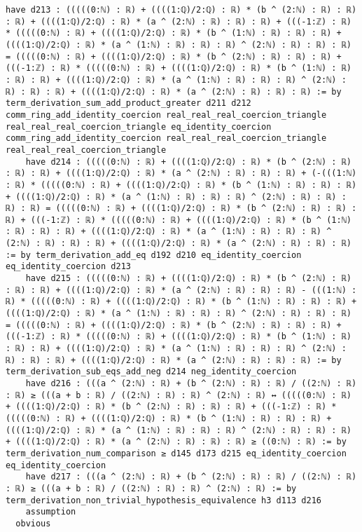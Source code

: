 \documentclass{article}
\begin{document}
\begin{tcolorbox}[colback=white!10, width=\linewidth]
\begin{lstlisting}[language=Lean4]
    have d213 : (((((0:ℕ) : ℝ) + ((((1:ℚ)/2:ℚ) : ℝ) * (b ^ (2:ℕ) : ℝ) : ℝ) : ℝ) + ((((1:ℚ)/2:ℚ) : ℝ) * (a ^ (2:ℕ) : ℝ) : ℝ) : ℝ) + (((-1:ℤ) : ℝ) * (((((0:ℕ) : ℝ) + ((((1:ℚ)/2:ℚ) : ℝ) * (b ^ (1:ℕ) : ℝ) : ℝ) : ℝ) + ((((1:ℚ)/2:ℚ) : ℝ) * (a ^ (1:ℕ) : ℝ) : ℝ) : ℝ) ^ (2:ℕ) : ℝ) : ℝ) : ℝ) = (((((0:ℕ) : ℝ) + ((((1:ℚ)/2:ℚ) : ℝ) * (b ^ (2:ℕ) : ℝ) : ℝ) : ℝ) + (((-1:ℤ) : ℝ) * (((((0:ℕ) : ℝ) + ((((1:ℚ)/2:ℚ) : ℝ) * (b ^ (1:ℕ) : ℝ) : ℝ) : ℝ) + ((((1:ℚ)/2:ℚ) : ℝ) * (a ^ (1:ℕ) : ℝ) : ℝ) : ℝ) ^ (2:ℕ) : ℝ) : ℝ) : ℝ) + ((((1:ℚ)/2:ℚ) : ℝ) * (a ^ (2:ℕ) : ℝ) : ℝ) : ℝ) := by term_derivation_sum_add_product_greater d211 d212 comm_ring_add_identity_coercion real_real_real_coercion_triangle real_real_real_coercion_triangle eq_identity_coercion comm_ring_add_identity_coercion real_real_real_coercion_triangle real_real_real_coercion_triangle
    have d214 : (((((0:ℕ) : ℝ) + ((((1:ℚ)/2:ℚ) : ℝ) * (b ^ (2:ℕ) : ℝ) : ℝ) : ℝ) + ((((1:ℚ)/2:ℚ) : ℝ) * (a ^ (2:ℕ) : ℝ) : ℝ) : ℝ) + (-(((1:ℕ) : ℝ) * (((((0:ℕ) : ℝ) + ((((1:ℚ)/2:ℚ) : ℝ) * (b ^ (1:ℕ) : ℝ) : ℝ) : ℝ) + ((((1:ℚ)/2:ℚ) : ℝ) * (a ^ (1:ℕ) : ℝ) : ℝ) : ℝ) ^ (2:ℕ) : ℝ) : ℝ) : ℝ) : ℝ) = (((((0:ℕ) : ℝ) + ((((1:ℚ)/2:ℚ) : ℝ) * (b ^ (2:ℕ) : ℝ) : ℝ) : ℝ) + (((-1:ℤ) : ℝ) * (((((0:ℕ) : ℝ) + ((((1:ℚ)/2:ℚ) : ℝ) * (b ^ (1:ℕ) : ℝ) : ℝ) : ℝ) + ((((1:ℚ)/2:ℚ) : ℝ) * (a ^ (1:ℕ) : ℝ) : ℝ) : ℝ) ^ (2:ℕ) : ℝ) : ℝ) : ℝ) + ((((1:ℚ)/2:ℚ) : ℝ) * (a ^ (2:ℕ) : ℝ) : ℝ) : ℝ) := by term_derivation_add_eq d192 d210 eq_identity_coercion eq_identity_coercion d213
    have d215 : (((((0:ℕ) : ℝ) + ((((1:ℚ)/2:ℚ) : ℝ) * (b ^ (2:ℕ) : ℝ) : ℝ) : ℝ) + ((((1:ℚ)/2:ℚ) : ℝ) * (a ^ (2:ℕ) : ℝ) : ℝ) : ℝ) - (((1:ℕ) : ℝ) * (((((0:ℕ) : ℝ) + ((((1:ℚ)/2:ℚ) : ℝ) * (b ^ (1:ℕ) : ℝ) : ℝ) : ℝ) + ((((1:ℚ)/2:ℚ) : ℝ) * (a ^ (1:ℕ) : ℝ) : ℝ) : ℝ) ^ (2:ℕ) : ℝ) : ℝ) : ℝ) = (((((0:ℕ) : ℝ) + ((((1:ℚ)/2:ℚ) : ℝ) * (b ^ (2:ℕ) : ℝ) : ℝ) : ℝ) + (((-1:ℤ) : ℝ) * (((((0:ℕ) : ℝ) + ((((1:ℚ)/2:ℚ) : ℝ) * (b ^ (1:ℕ) : ℝ) : ℝ) : ℝ) + ((((1:ℚ)/2:ℚ) : ℝ) * (a ^ (1:ℕ) : ℝ) : ℝ) : ℝ) ^ (2:ℕ) : ℝ) : ℝ) : ℝ) + ((((1:ℚ)/2:ℚ) : ℝ) * (a ^ (2:ℕ) : ℝ) : ℝ) : ℝ) := by term_derivation_sub_eqs_add_neg d214 neg_identity_coercion
    have d216 : (((a ^ (2:ℕ) : ℝ) + (b ^ (2:ℕ) : ℝ) : ℝ) / ((2:ℕ) : ℝ) : ℝ) ≥ (((a + b : ℝ) / ((2:ℕ) : ℝ) : ℝ) ^ (2:ℕ) : ℝ) ↔ (((((0:ℕ) : ℝ) + ((((1:ℚ)/2:ℚ) : ℝ) * (b ^ (2:ℕ) : ℝ) : ℝ) : ℝ) + (((-1:ℤ) : ℝ) * (((((0:ℕ) : ℝ) + ((((1:ℚ)/2:ℚ) : ℝ) * (b ^ (1:ℕ) : ℝ) : ℝ) : ℝ) + ((((1:ℚ)/2:ℚ) : ℝ) * (a ^ (1:ℕ) : ℝ) : ℝ) : ℝ) ^ (2:ℕ) : ℝ) : ℝ) : ℝ) + ((((1:ℚ)/2:ℚ) : ℝ) * (a ^ (2:ℕ) : ℝ) : ℝ) : ℝ) ≥ ((0:ℕ) : ℝ) := by term_derivation_num_comparison ≥ d145 d173 d215 eq_identity_coercion eq_identity_coercion
    have d217 : (((a ^ (2:ℕ) : ℝ) + (b ^ (2:ℕ) : ℝ) : ℝ) / ((2:ℕ) : ℝ) : ℝ) ≥ (((a + b : ℝ) / ((2:ℕ) : ℝ) : ℝ) ^ (2:ℕ) : ℝ) := by term_derivation_non_trivial_hypothesis_equivalence h3 d113 d216
    assumption
  obvious

\end{lstlisting}
\end{tcolorbox}
\end{document}

